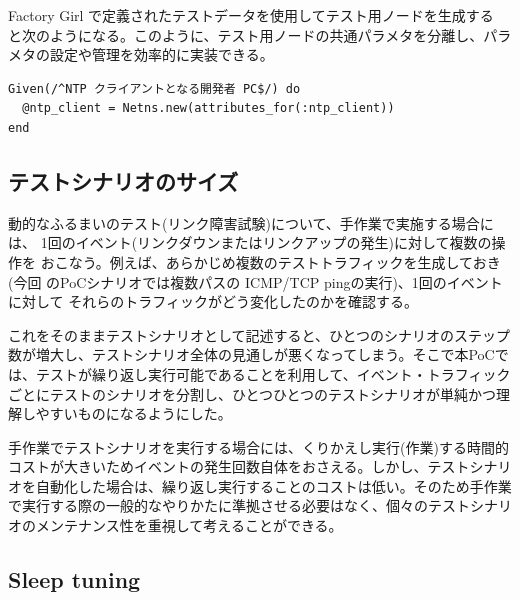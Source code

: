 Factory Girl で定義されたテストデータを使用してテスト用ノードを生成する
と次のようになる。このように、テスト用ノードの共通パラメタを分離し、パラ
メタの設定や管理を効率的に実装できる。
\begin{lstlisting}
Given(/^NTP クライアントとなる開発者 PC$/) do
  @ntp_client = Netns.new(attributes_for(:ntp_client))
end
\end{lstlisting}

  \subsection{テストシナリオのサイズ}


動的なふるまいのテスト(リンク障害試験)について、手作業で実施する場合には、
1回のイベント(リンクダウンまたはリンクアップの発生)に対して複数の操作を
おこなう。例えば、あらかじめ複数のテストトラフィックを生成しておき(今回
のPoCシナリオでは複数パスの ICMP/TCP pingの実行)、1回のイベントに対して
それらのトラフィックがどう変化したのかを確認する。

これをそのままテストシナリオとして記述すると、ひとつのシナリオのステップ
数が増大し、テストシナリオ全体の見通しが悪くなってしまう。そこで本PoCで
は、テストが繰り返し実行可能であることを利用して、イベント・トラフィック
ごとにテストのシナリオを分割し、ひとつひとつのテストシナリオが単純かつ理
解しやすいものになるようにした。

手作業でテストシナリオを実行する場合には、くりかえし実行(作業)する時間的
コストが大きいためイベントの発生回数自体をおさえる。しかし、テストシナリ
オを自動化した場合は、繰り返し実行することのコストは低い。そのため手作業
で実行する際の一般的なやりかたに準拠させる必要はなく、個々のテストシナリ
オのメンテナンス性を重視して考えることができる。

  \subsection{Sleep tuning}
  \label{sec:sleep-tuning}

